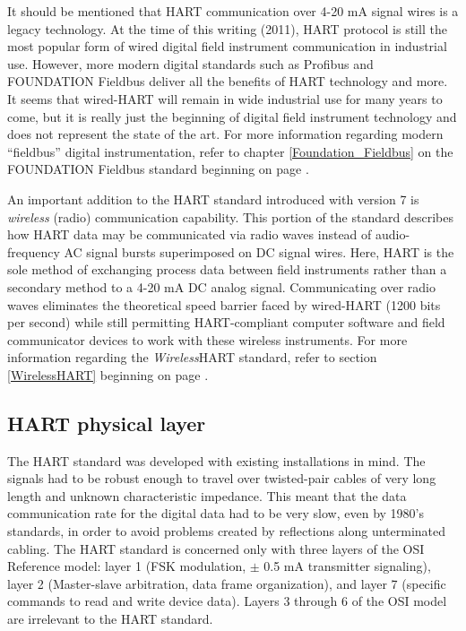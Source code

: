 \vskip 10pt

It should be mentioned that HART communication over 4-20 mA signal wires is a legacy technology.  At the time of this writing (2011), HART protocol is still the most popular form of wired digital field instrument communication in industrial use.  However, more modern digital standards such as Profibus and FOUNDATION Fieldbus deliver all the benefits of HART technology and more.  It seems that wired-HART will remain in wide industrial use for many years to come, but it is really just the beginning of digital field instrument technology and does not represent the state of the art.  For more information regarding modern ``fieldbus'' digital instrumentation, refer to chapter \ref{Foundation_Fieldbus} on the FOUNDATION Fieldbus standard beginning on page \pageref{Foundation_Fieldbus}.      

An important addition to the HART standard introduced with version 7 is \textit{wireless} (radio) communication capability.  This portion of the standard describes how HART data may be communicated via radio waves instead of audio-frequency AC signal bursts superimposed on DC signal wires.  Here, HART is the sole method of exchanging process data between field instruments rather than a secondary method to a 4-20 mA DC analog signal.  Communicating over radio waves eliminates the theoretical speed barrier faced by wired-HART (1200 bits per second) while still permitting HART-compliant computer software and field communicator devices to work with these wireless instruments.  For more information regarding the \textsl{Wireless}HART standard, refer to section \ref{WirelessHART} beginning on page \pageref{WirelessHART}. 




\filbreak
\subsection{HART physical layer}

The HART standard was developed with existing installations in mind.  The signals had to be robust enough to travel over twisted-pair cables of very long length and unknown characteristic impedance.  This meant that the data communication rate for the digital data had to be very slow, even by 1980's standards, in order to avoid problems created by reflections along unterminated cabling.  The HART standard is concerned only with three layers of the OSI Reference model: layer 1 (FSK modulation, $\pm$ 0.5 mA transmitter signaling), layer 2 (Master-slave arbitration, data frame organization), and layer 7 (specific commands to read and write device data).  Layers 3 through 6 of the OSI model are irrelevant to the HART standard.

